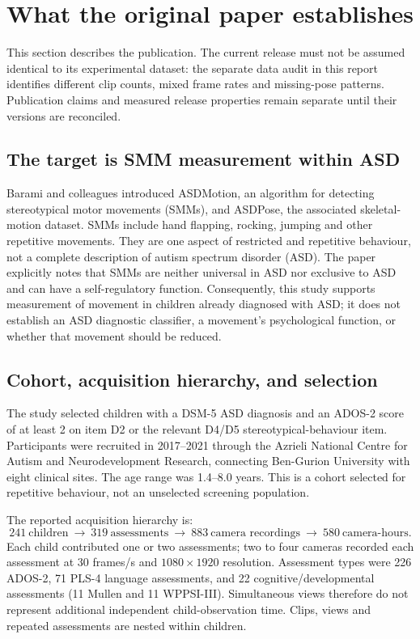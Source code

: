 \section{What the original paper establishes}
\label{sec:original-paper}

This section describes the publication. The current release must not be assumed identical to its experimental dataset: the separate data audit in this report identifies different clip counts, mixed frame rates and missing-pose patterns. Publication claims and measured release properties remain separate until their versions are reconciled.

\subsection{The target is SMM measurement within ASD}
Barami and colleagues introduced ASDMotion, an algorithm for detecting stereotypical motor movements (SMMs), and ASDPose, the associated skeletal-motion dataset. SMMs include hand flapping, rocking, jumping and other repetitive movements. They are one aspect of restricted and repetitive behaviour, not a complete description of autism spectrum disorder (ASD). The paper explicitly notes that SMMs are neither universal in ASD nor exclusive to ASD and can have a self-regulatory function. Consequently, this study supports measurement of movement in children already diagnosed with ASD; it does not establish an ASD diagnostic classifier, a movement's psychological function, or whether that movement should be reduced. \cite[pp.~1--3]{barami2024}

\subsection{Cohort, acquisition hierarchy, and selection}
The study selected children with a DSM-5 ASD diagnosis and an ADOS-2 score of at least 2 on item D2 or the relevant D4/D5 stereotypical-behaviour item. Participants were recruited in 2017--2021 through the Azrieli National Centre for Autism and Neurodevelopment Research, connecting Ben-Gurion University with eight clinical sites. The age range was 1.4--8.0 years. This is a cohort selected for repetitive behaviour, not an unselected screening population. \cite[p.~3]{barami2024}

The reported acquisition hierarchy is:
\[
241\ \text{children}\ \longrightarrow\ 319\ \text{assessments}
\ \longrightarrow\ 883\ \text{camera recordings}
\ \longrightarrow\ 580\ \text{camera-hours}.
\]
Each child contributed one or two assessments; two to four cameras recorded each assessment at 30 frames/s and $1080\times1920$ resolution. Assessment types were 226 ADOS-2, 71 PLS-4 language assessments, and 22 cognitive/developmental assessments (11 Mullen and 11 WPPSI-III). Simultaneous views therefore do not represent additional independent child-observation time. Clips, views and repeated assessments are nested within children. \cite[p.~3]{barami2024}

